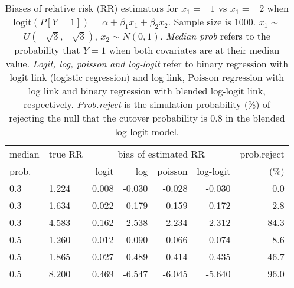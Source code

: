 \documentclass[12pt,a4paper]{article}
\begin{document}
\begin{table}[H] 
\small\sf\centering 
\caption{Biases of relative risk (RR) estimators for $x_1=-1$ vs $x_1=-2$ when $\mbox{logit}(P[Y=1])=\alpha+\beta_1 x_1 + \beta_2 x_2$. Sample size is 1000. $x_1 \sim $$U(-\sqrt{3},-\sqrt{3})$, $x_2 \sim N(0,1)$. {\it Median prob} refers to the probability that $Y=1$ when both covariates are at their median value. {\it Logit, log, poisson and log-logit} refer to binary regression with logit link (logistic regression) and log link, Poisson regression with log link and binary regression with blended log-logit link, respectively. {\it Prob.reject} is the simulation probability (\%) of rejecting the null that the cutover probability is $0.8$ in the blended log-logit model.} 
\begin{tabular}{llrrrrr} 
\toprule 
median & true RR & \multicolumn{4}{c}{bias of estimated RR} & prob.reject \\ 
prob. & & logit & log & poisson & log-logit  & (\%) \\ \midrule 
0.3 & 1.224 & 0.008 & -0.030 & -0.028 & -0.030 &  0.0 \\  
0.3 & 1.634 & 0.022 & -0.179 & -0.159 & -0.172 &  2.8 \\  
0.3 & 4.583 & 0.162 & -2.538 & -2.234 & -2.312 & 84.3 \\  
0.5 & 1.260 & 0.012 & -0.090 & -0.066 & -0.074 &  8.6 \\  
0.5 & 1.865 & 0.027 & -0.489 & -0.414 & -0.435 & 46.7 \\  
0.5 & 8.200 & 0.469 & -6.547 & -6.045 & -5.640 & 96.0 \\  
\bottomrule 
\end{tabular} 
\end{table} 
\end{document}
